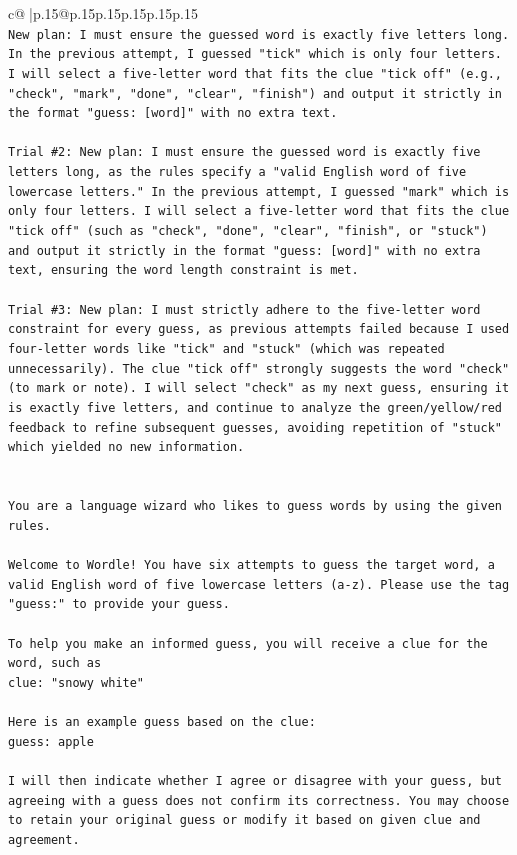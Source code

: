 \documentclass{article}
\begin{document}
{\begin{supertabular}{c@{$\;$}|p{.15\linewidth}@{}p{.15\linewidth}p{.15\linewidth}p{.15\linewidth}p{.15\linewidth}p{.15\linewidth}}
{{{\\ 
\texttt{New plan: I must ensure the guessed word is exactly five letters long. In the previous attempt, I guessed "tick" which is only four letters. I will select a five{-}letter word that fits the clue "tick off" (e.g., "check", "mark", "done", "clear", "finish") and output it strictly in the format "guess: {[}word{]}" with no extra text.} \\
\\ 
\texttt{Trial \#2: New plan: I must ensure the guessed word is exactly five letters long, as the rules specify a "valid English word of five lowercase letters." In the previous attempt, I guessed "mark" which is only four letters. I will select a five{-}letter word that fits the clue "tick off" (such as "check", "done", "clear", "finish", or "stuck") and output it strictly in the format "guess: {[}word{]}" with no extra text, ensuring the word length constraint is met.} \\
\\ 
\texttt{Trial \#3: New plan: I must strictly adhere to the five{-}letter word constraint for every guess, as previous attempts failed because I used four{-}letter words like "tick" and "stuck" (which was repeated unnecessarily). The clue "tick off" strongly suggests the word "check" (to mark or note). I will select "check" as my next guess, ensuring it is exactly five letters, and continue to analyze the green/yellow/red feedback to refine subsequent guesses, avoiding repetition of "stuck" which yielded no new information.} \\
\\ 
\\ 
\texttt{You are a language wizard who likes to guess words by using the given rules.} \\
\\ 
\texttt{Welcome to Wordle! You have six attempts to guess the target word, a valid English word of five lowercase letters (a{-}z). Please use the tag "guess:" to provide your guess.} \\
\\ 
\texttt{To help you make an informed guess, you will receive a clue for the word, such as} \\
\texttt{clue: "snowy white"} \\
\\ 
\texttt{Here is an example guess based on the clue: } \\
\texttt{guess: apple} \\
\\ 
\texttt{I will then indicate whether I agree or disagree with your guess, but agreeing with a guess does not confirm its correctness. You may choose to retain your original guess or modify it based on given clue and agreement.} \\
}}}
\end{supertabular}}
\end{document}
